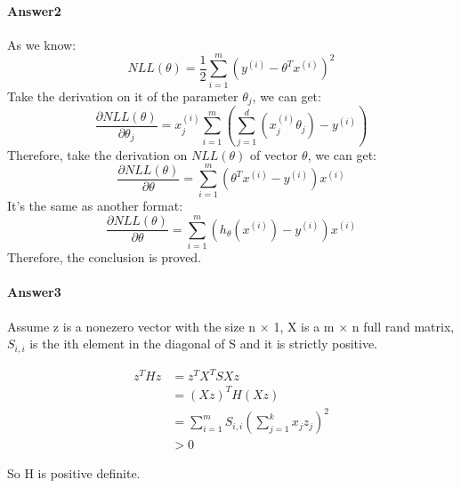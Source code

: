 \documentclass[paper=a4, fontsize=11pt]{scrartcl} %
\numberwithin{equation}{section} %
\numberwithin{figure}{section} %
\numberwithin{table}{section} %
\begin{document}
\paragraph{\textbf{Answer2}}
As we know:
\begin{equation*}
NLL\left ( \theta  \right )=\frac{1}{2}\sum_{i=1}^{m}\left ( y^{\left ( i \right )}-\theta ^{T}x^{\left ( i \right )} \right )^{2}
\end{equation*}
Take the derivation on it of the parameter $\theta_{j}$, we can get:
\begin{equation*}
\frac{\partial NLL\left ( \theta  \right ) }{\partial \theta _{j}}=x_{j}^{\left ( i \right )}\sum_{i=1}^{m}\left ( \sum_{j=1}^{d} \left (x_{j}^{\left ( i \right )}\theta _{j}\right) -y^{\left ( i \right )} \right )
\end{equation*}
Therefore, take the derivation on $NLL\left ( \theta  \right )$ of vector $\theta$, we can get:
\begin{equation*}
\frac{\partial NLL\left ( \theta  \right ) }{\partial \theta }=\sum_{i=1}^{m}\left ( \theta ^{T}x^{\left ( i \right )} -y^{\left ( i \right )} \right )x^{\left ( i \right )}
\end{equation*}
It's the same as another format:
\begin{equation*}
\frac{\partial NLL\left ( \theta  \right ) }{\partial \theta }=\sum_{i=1}^{m}\left ( h_{\theta }\left ( x^{\left ( i \right )} \right ) -y^{\left ( i \right )} \right )x^{\left ( i \right )}
\end{equation*}
Therefore, the conclusion is proved.

\paragraph{\textbf{Answer3}}
Assume z is a nonezero vector with the size n $\times$ 1, X is a m $\times$ n full rand matrix, $S_{i, i}$ is the ith element in the diagonal of S and it is strictly positive.

\begin{equation*}
\begin{aligned}
z^{T}Hz &= z^{T}X^{T}SXz \\ &= (Xz)^{T}H(Xz) \\ &=\sum_{i=1}^{m}S_{i,i}(\sum_{j=1}^{k}x_{j}z_{j})^{2}\\&> 0
\end{aligned}
\end{equation*}

So H is positive definite.
\end{document}
